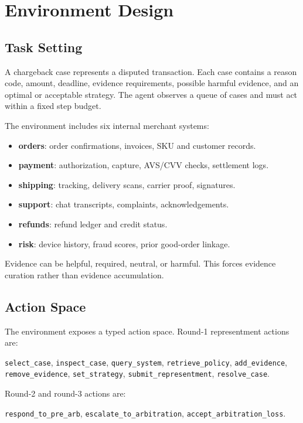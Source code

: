 \documentclass[11pt]{article}
\begin{document}
\section{Environment Design}

\subsection{Task Setting}

A chargeback case represents a disputed transaction. Each case contains a reason code, amount, deadline, evidence requirements, possible harmful evidence, and an optimal or acceptable strategy. The agent observes a queue of cases and must act within a fixed step budget.

The environment includes six internal merchant systems:
\begin{itemize}[leftmargin=*]
    \item \textbf{orders}: order confirmations, invoices, SKU and customer records.
    \item \textbf{payment}: authorization, capture, AVS/CVV checks, settlement logs.
    \item \textbf{shipping}: tracking, delivery scans, carrier proof, signatures.
    \item \textbf{support}: chat transcripts, complaints, acknowledgements.
    \item \textbf{refunds}: refund ledger and credit status.
    \item \textbf{risk}: device history, fraud scores, prior good-order linkage.
\end{itemize}

Evidence can be helpful, required, neutral, or harmful. This forces evidence curation rather than evidence accumulation.

\subsection{Action Space}

The environment exposes a typed action space. Round-1 representment actions are:
\begin{center}
\texttt{select\_case}, \texttt{inspect\_case}, \texttt{query\_system}, \texttt{retrieve\_policy}, \texttt{add\_evidence}, \texttt{remove\_evidence}, \texttt{set\_strategy}, \texttt{submit\_representment}, \texttt{resolve\_case}.
\end{center}

Round-2 and round-3 actions are:
\begin{center}
\texttt{respond\_to\_pre\_arb}, \texttt{escalate\_to\_arbitration}, \texttt{accept\_arbitration\_loss}.
\end{center}
\end{document}
